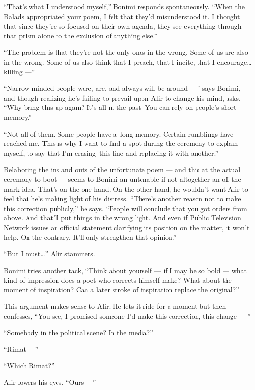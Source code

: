 \documentclass[twoside,11pt]{book}
\begin{document}
``That's what I understood myself,'' Bonimi responds spontaneously. ``When the
Balads appropriated your poem, I felt that they'd misunderstood it. I thought that since they're so focused on their
own agenda, they see everything through that prism alone to the exclusion of anything else.''

``The problem is that they're not the only ones in the wrong. Some of us are also in the wrong. Some of us
also think that I preach, that I incite, that I encourage{\ldots}killing ---''

``Narrow-minded people were, are, and always will be around ---''
says Bonimi, and though
realizing he's failing to prevail upon Alir to change his mind, asks, ``Why bring this up again? It's all
in the past. You can rely on people's short memory.''

``Not all of them. Some people have a~long memory. Certain rumblings have reached me. This is why I want to
find a spot during the ceremony to explain myself, to say that I'm erasing~this line and replacing it with
another.''

Belaboring the ins and outs of the unfortunate poem ---  and this at the actual ceremony to boot --- seems to Bonimi an
untenable if not altogether an off the mark idea. That's on the one hand. On the other hand, he wouldn't want Alir to
feel that he's making light of his distress. ``There's another reason not to make this correction
publicly,'' he says. ``People will conclude that you got orders from above. And that'll put things in the wrong
light. And even if Public Television Network issues an official statement clarifying its position on the matter, it
won't help. On the contrary. It'll only strengthen that opinion.''

``But I must{\ldots}'' Alir stammers.

Bonimi tries another tack, ``Think about yourself --- if I may be so bold --- what kind of impression does a
poet who corrects himself make? What about the moment of inspiration? Can a later stroke of inspiration replace the
original?''

This argument makes sense to Alir. He lets it ride for a moment but then confesses, ``You see, I promised
someone I'd make this correction, this change~---''

``Somebody in the political scene? In the media?''

``Rimat ---''

``Which Rimat?''

Alir lowers his eyes. ``Ours ---''
\end{document}
